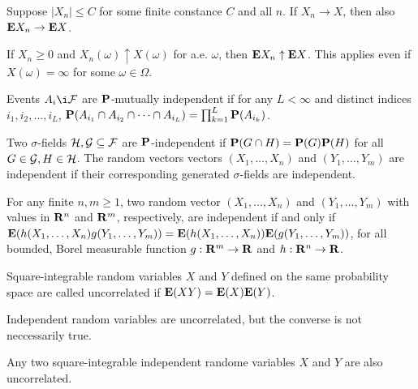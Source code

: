 \begin{corollary*}
Suppose $|X_n| \le C$ for some finite constance $C$ and all $n$. If $X_n
\rightarrow X$, then also $\mathbf{E} X_n \rightarrow \mathbf{E} X$.
\end{corollary*} 

\begin{theorem*}
If $X_n \ge 0$ and $X_n(\omega)\uparrow X(\omega)$ for a.e. $\omega$, then
$\mathbf{E} X_n \uparrow \mathbf{E} X$. This applies even if $X(\omega) = \infty$ for some
$\omega \in \Omega$.
\end{theorem*} 

\begin{definition*} 
Events $A_i \i \F$ are $\mathbf{P}$-mutually independent if for any $L < \infty$ and
distinct indices $i_1, i_2, \dots, i_L$,
$\mathbf{P}(A_{i_1} \cap A_{i_2} \cap \dots \cap A_{i_L}) = \prod_{k=1}^L
\mathbf{P}(A_{i_k})$.
\end{definition*} 

\begin{definition*} 
Two $\sigma$-fields $\mathcal{H}, \mathcal{G} \subseteq \mathcal{F}$ are $\mathbf{P}$-independent if $\mathbf{P}(G \cap
H) = \mathbf{P}(G) \mathbf{P}(H)$ for all $G \in \mathcal{G}, H \in \mathcal{H}$. The random vectors vectors
$(X_1, \dots, X_n)$ and $(Y_1, \dots, Y_m)$ are independent if their
corresponding generated $\sigma$-fields are independent.
\end{definition*} 

\begin{proposition*} 
For any finite $n, m \ge 1$, two random vector $(X_1, \dots, X_n)$ and $(Y_1,
\dots, Y_m)$ with values in $\mathbf{R}^n$ and $\mathbf{R}^m$, respectively, are independent if
and only if $\mathbf{E}(h(X_1, \dots, X_n) g(Y_1, \dots, Y_m))
= \mathbf{E}(h(X_1, \dots, X_n)) \mathbf{E}(g(Y_1, \dots, Y_m))$, for all bounded, Borel
measurable function $g: \mathbf{R}^m \rightarrow \mathbf{R}$ and $h: \mathbf{R}^n \rightarrow \mathbf{R}$.
\end{proposition*} 

\begin{definition*} 
Square-integrable random variables $X$ and $Y$ defined on the same probability
space are called uncorrelated if $\mathbf{E}(XY) = \mathbf{E}(X) \mathbf{E}(Y)$.
\end{definition*} 

\begin{remark*} 
Independent random variables are uncorrelated, but the converse is not
neccessarily true.
\end{remark*} 

\begin{proposition*} 
Any two square-integrable independent randome variables $X$ and $Y$ are also
uncorrelated.
\end{proposition*} 







